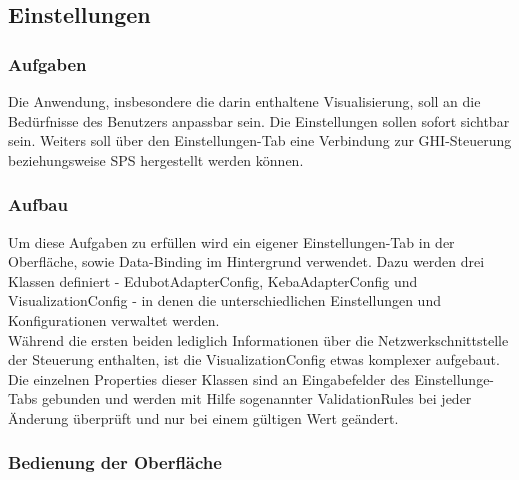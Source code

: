 \subsection{Einstellungen}

\subsubsection{Aufgaben}
Die Anwendung, insbesondere die darin enthaltene Visualisierung, soll an die Bedürfnisse des Benutzers anpassbar sein. Die Einstellungen sollen sofort sichtbar sein. Weiters soll über den Einstellungen-Tab eine Verbindung zur GHI-Steuerung beziehungsweise SPS hergestellt werden können.

\subsubsection{Aufbau}
Um diese Aufgaben zu erfüllen wird ein eigener Einstellungen-Tab in der Oberfläche, sowie Data-Binding im Hintergrund verwendet. Dazu werden drei Klassen definiert - EdubotAdapterConfig, KebaAdapterConfig und VisualizationConfig - in denen die unterschiedlichen Einstellungen und Konfigurationen verwaltet werden. \\
Während die ersten beiden lediglich Informationen über die Netzwerkschnittstelle der Steuerung enthalten, ist die VisualizationConfig etwas komplexer aufgebaut. Die einzelnen Properties dieser Klassen sind an Eingabefelder des Einstellunge-Tabs gebunden und werden mit Hilfe sogenannter ValidationRules bei jeder Änderung überprüft und nur bei einem gültigen Wert geändert.

\subsubsection{Bedienung der Oberfläche}

